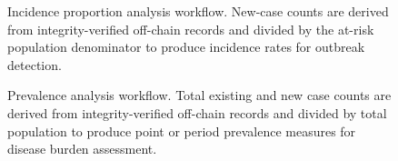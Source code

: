 \begin{figure}[!ht]
\centering
{}
\caption{Incidence proportion analysis workflow. New-case counts are derived from integrity-verified off-chain records and divided by the at-risk population denominator to produce incidence rates for outbreak detection.}\label{fig:incidence}
\end{figure}

%
%
%


\begin{figure}[!ht]
\centering
{}
\caption{Prevalence analysis workflow. Total existing and new case counts are derived from integrity-verified off-chain records and divided by total population to produce point or period prevalence measures for disease burden assessment.}\label{fig:prevalence}
\end{figure}

%
%
%

